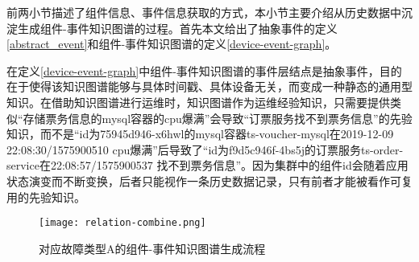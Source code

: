 前两小节描述了组件信息、事件信息获取的方式，本小节主要介绍从历史数据中沉淀生成组件-事件知识图谱的过程。首先本文给出了抽象事件的定义\ref{abstract_event}和组件-事件知识图谱的定义\ref{device-event-graph}。

在定义\ref{device-event-graph}中组件-事件知识图谱的事件层结点是抽象事件，目的在于使得该知识图谱能够与具体时间戳、具体设备无关，而变成一种静态的通用型知识。在借助知识图谱进行运维时，知识图谱作为运维经验知识，只需要提供类似“存储票务信息的mysql容器的cpu爆满”会导致“订票服务找不到票务信息”的先验知识，而不是“id为75945d946-x6hwl的mysql容器ts-voucher-mysql在2019-12-09 22:08:30/1575900510 cpu爆满”后导致了“id为f9d5c946f-4bs5j的订票服务ts-order-service在22:08:57/1575900537 找不到票务信息”。因为集群中的组件id会随着应用状态演变而不断变换，后者只能视作一条历史数据记录，只有前者才能被看作可复用的先验知识。
\begin{figure}[htbp]
    \centering
    \texttt{[image: relation-combine.png]}
    \caption{对应故障类型A的组件-事件知识图谱生成流程\label{relation-combine}}
\end{figure}

